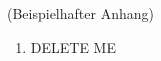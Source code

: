 
\addchap{\langanhang}

(Beispielhafter Anhang)
 

{\Large
\begin{enumerate}[label=\Alph*.]
	\item DELETE ME
\end{enumerate}
}
\pagebreak


